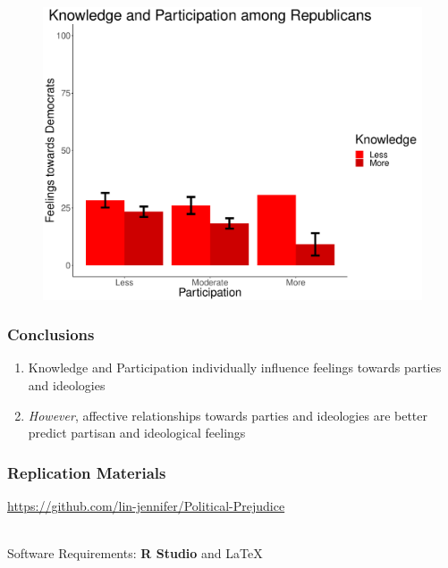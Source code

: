 \documentclass[14pt]{beamer}
\newcommand\e{\emph}
\newcommand\tb{\textbf}
\begin{document}
\begin{frame}
\begin{center}
	\begin{figure}[ht!]  
		{	 \includegraphics[width=\textwidth]{KPDemARep}}
	\end{figure}
\end{center}
\end{frame}

\begin{frame}
\frametitle{Conclusions}
\begin{enumerate}
	\item Knowledge and Participation individually influence feelings towards parties and ideologies
	\item \e{However}, affective relationships towards parties and ideologies are better predict partisan and ideological feelings
\end{enumerate}
\end{frame}

\begin{frame}
\frametitle{Replication Materials}
\begin{center}
	\url{https://github.com/lin-jennifer/Political-Prejudice}
	
~~\\
Software Requirements: \tb{R Studio} and \LaTeX

\end{center}
\end{frame}
\end{document}
